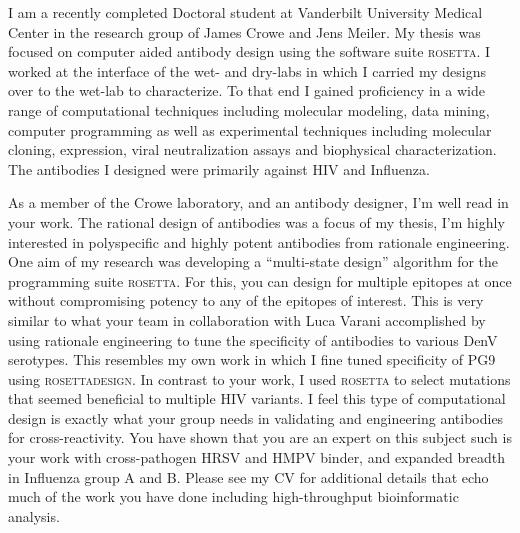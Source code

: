 


\begin{newlfm}
I am a recently completed Doctoral student at Vanderbilt University Medical Center in the research group of James Crowe and Jens Meiler. My thesis was focused on computer aided antibody design using the software suite \textsc{rosetta}. I worked at the interface of the wet- and dry-labs in which I carried my designs over to the wet-lab to characterize. To that end I gained proficiency in a wide range of computational techniques including molecular modeling, data mining,  computer programming as well as experimental techniques including molecular cloning, expression, viral neutralization assays and biophysical characterization. The antibodies I designed were primarily against HIV and Influenza.


As a member of the Crowe laboratory, and an antibody designer, I'm well read in your work. The rational design of antibodies was a focus of my thesis, I'm highly interested in polyspecific and highly potent antibodies from rationale engineering. One aim of my research was developing a ``multi-state design'' algorithm for the programming suite \textsc{rosetta}. For this, you can design for multiple epitopes at once without compromising potency to any of the epitopes of interest. This is very similar to what your team in collaboration with Luca Varani accomplished by using rationale engineering to tune the specificity of antibodies to various DenV serotypes. This resembles my own work in which I fine tuned specificity of PG9 using \textsc{rosettadesign}. In contrast to your work, I used \textsc{rosetta} to select mutations that seemed beneficial to multiple HIV variants. I feel this type of computational design is exactly what your group needs in validating and engineering antibodies for cross-reactivity. You have shown that you are an expert on this subject such is your work with cross-pathogen HRSV and HMPV binder, and expanded breadth in Influenza group A and B. Please see my CV for additional details that echo much of the work you have done including high-throughput bioinformatic analysis.



\end{newlfm}
